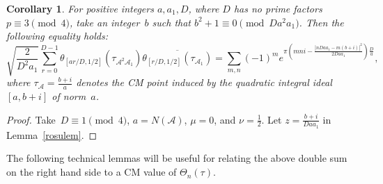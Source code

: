 \documentclass[11pt, reqno]{amsart}
\theoremstyle{plain}
\newtheorem{corollary}[theorem]{Corollary}
\theoremstyle{definition}
\numberwithin{equation}{section}
\begin{document}
\begin{corollary}\label{cordd}
For positive integers $a,a_{1},D$, where $D$ has no prime factors~$p\equiv3\pmod{4}$, take an integer~$b$ such that $b^{2}+1\equiv0\pmod{Da^{2}a_{1}}$. Then the following equality holds:
    $$
    \sqrt{\frac{2}{D^{2}a_{1}}}\sum_{r=0}^{D-1}\theta_{[ar/D,1/2]}(\tau_{\mathcal{A}^{2}\mathcal{A}_{1}})\overline{\theta_{[r/D,1/2]}(\tau_{\mathcal{A}_{1}})}=\sum_{m,n}(-1)^{m}e^{\pi(mni-\frac{|nDaa_{1}-m(b+i)|^{2}}{2Daa_{1}})\frac{D}{a}},
    $$
    where $\tau_{\mathcal{A}}=\frac{b+i}{a}$ denotes the CM point induced by the quadratic integral ideal $[a,b+i]$ of norm~$a$.
\end{corollary}

\begin{proof}
    Take~$D\equiv1\pmod{4}$, $a=N(\mathcal{A})$, $\mu=0$, and $\nu=\frac{1}{2}$. Let $z=\frac{b+i}{Daa_{1}}$ in Lemma~\ref{rosulem}.
\end{proof}


The following  technical lemmas will be useful for relating the above double sum on the right hand
side to a CM value of $\Theta_{n}(\tau)$.
\end{document}
